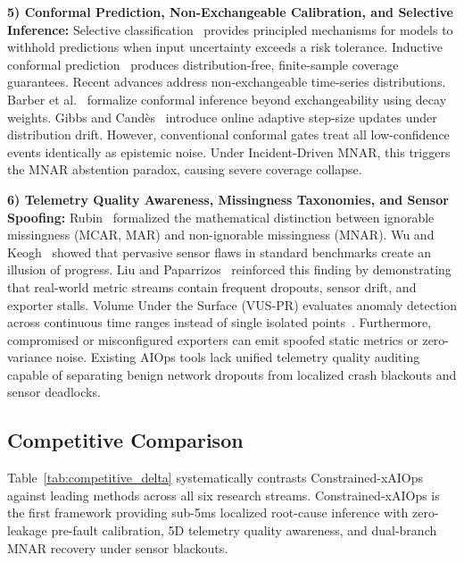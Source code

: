 \documentclass[conference]{IEEEtran}
\begin{document}
\textbf{5) Conformal Prediction, Non-Exchangeable Calibration, and Selective Inference:} Selective classification~\cite{geifman2017selective} provides principled mechanisms for models to withhold predictions when input uncertainty exceeds a risk tolerance.
Inductive conformal prediction~\cite{vovk2005algorithmic,angelopoulos2021gentle} produces distribution-free, finite-sample coverage guarantees.
Recent advances address non-exchangeable time-series distributions.
Barber et al.~\cite{barber2023conformal} formalize conformal inference beyond exchangeability using decay weights.
Gibbs and Cand{\`e}s~\cite{gibbs2021adaptive} introduce online adaptive step-size updates under distribution drift.
However, conventional conformal gates treat all low-confidence events identically as epistemic noise.
Under Incident-Driven MNAR, this triggers the MNAR abstention paradox, causing severe coverage collapse.

\textbf{6) Telemetry Quality Awareness, Missingness Taxonomies, and Sensor Spoofing:} Rubin~\cite{rubin1976inference} formalized the mathematical distinction between ignorable missingness (MCAR, MAR) and non-ignorable missingness (MNAR).
Wu and Keogh~\cite{wu2021current} showed that pervasive sensor flaws in standard benchmarks create an illusion of progress.
Liu and Paparrizos~\cite{liu2024tsbad,paparrizos2022vus} reinforced this finding by demonstrating that real-world metric streams contain frequent dropouts, sensor drift, and exporter stalls.
Volume Under the Surface (VUS-PR) evaluates anomaly detection across continuous time ranges instead of single isolated points~\cite{paparrizos2022vus}.
Furthermore, compromised or misconfigured exporters can emit spoofed static metrics or zero-variance noise.
Existing AIOps tools lack unified telemetry quality auditing capable of separating benign network dropouts from localized crash blackouts and sensor deadlocks.

\subsection{Competitive Comparison}
Table~\ref{tab:competitive_delta} systematically contrasts Constrained-xAIOps against leading methods across all six research streams.
Constrained-xAIOps is the first framework providing sub-5ms localized root-cause inference with zero-leakage pre-fault calibration, 5D telemetry quality awareness, and dual-branch MNAR recovery under sensor blackouts.
\end{document}
